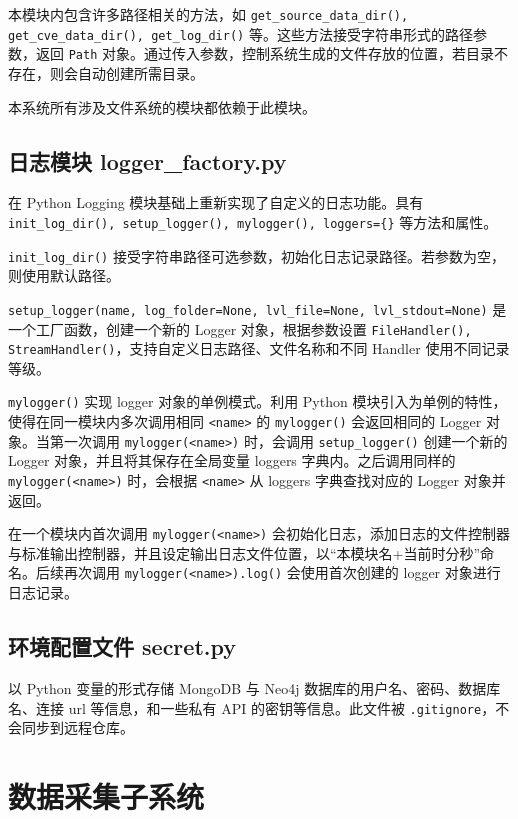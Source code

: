 \documentclass[a4paper,AutoFakeBold,oneside,12pt]{book}
\begin{document}
本模块内包含许多路径相关的方法，如 \lstinline|get_source_data_dir(), get_cve_data_dir(), get_log_dir()| 等。这些方法接受字符串形式的路径参数，返回 \lstinline|Path| 对象。通过传入参数，控制系统生成的文件存放的位置，若目录不存在，则会自动创建所需目录。

本系统所有涉及文件系统的模块都依赖于此模块。

\subsection{日志模块 logger{\_}factory.py}

在 Python Logging 模块基础上重新实现了自定义的日志功能。具有 \lstinline|init_log_dir(), setup_logger(), mylogger(), loggers={}| 等方法和属性。

\lstinline|init_log_dir()| 接受字符串路径可选参数，初始化日志记录路径。若参数为空，则使用默认路径。

\lstinline|setup_logger(name, log_folder=None, lvl_file=None, lvl_stdout=None)| 是一个工厂函数，创建一个新的 Logger 对象，根据参数设置 \lstinline|FileHandler(), StreamHandler()|，支持自定义日志路径、文件名称和不同 Handler 使用不同记录等级。

\lstinline[style = python]|mylogger()| 实现 logger 对象的单例模式。利用 Python 模块引入为单例的特性，使得在同一模块内多次调用相同 \lstinline[style = python]|<name>| 的 \lstinline[style = python]|mylogger()| 会返回相同的 Logger 对象。当第一次调用 \lstinline|mylogger(<name>)| 时，会调用 \lstinline|setup_logger()| 创建一个新的 Logger 对象，并且将其保存在全局变量 loggers 字典内。之后调用同样的 \lstinline|mylogger(<name>)| 时，会根据 \lstinline|<name>| 从 loggers 字典查找对应的 Logger 对象并返回。

在一个模块内首次调用 \lstinline[style = python]|mylogger(<name>)| 会初始化日志，添加日志的文件控制器与标准输出控制器，并且设定输出日志文件位置，以“本模块名+当前时分秒”命名。后续再次调用 \lstinline[style = python]|mylogger(<name>).log()| 会使用首次创建的 logger 对象进行日志记录。

\subsection{环境配置文件 secret.py}

以 Python 变量的形式存储 MongoDB 与 Neo4j 数据库的用户名、密码、数据库名、连接 url 等信息，和一些私有 API 的密钥等信息。此文件被 \lstinline|.gitignore|，不会同步到远程仓库。

\section{数据采集子系统}
\end{document}
